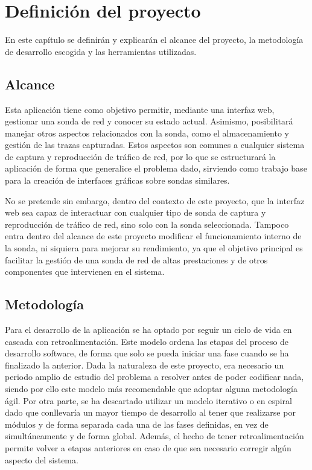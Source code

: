 \chapter{Definición del proyecto\label{cap:defProyecto}}

En este capítulo se definirán y explicarán el alcance del proyecto, la metodología de desarrollo escogida y las herramientas utilizadas.

\section{Alcance\label{sec:dp:alcance}}

Esta aplicación tiene como objetivo permitir, mediante una interfaz web, gestionar una sonda de red y conocer su estado actual.
Asimismo, posibilitará manejar otros aspectos relacionados con la sonda, como el almacenamiento y gestión de las \glspl{traza} capturadas.
Estos aspectos son comunes a cualquier sistema de captura y reproducción de tráfico de red, por lo que se estructurará la aplicación de forma que generalice el problema dado, sirviendo como trabajo base para la creación de interfaces gráficas sobre sondas similares.

No se pretende sin embargo, dentro del contexto de este proyecto, que la interfaz web sea capaz de interactuar con cualquier tipo de sonda de captura y reproducción de tráfico de red, sino solo con la sonda seleccionada.
Tampoco entra dentro del alcance de este proyecto modificar el funcionamiento interno de la sonda, ni siquiera para mejorar su rendimiento, ya que el objetivo principal es facilitar la gestión de una sonda de red de altas prestaciones y de otros componentes que intervienen en el sistema.

\section{Metodología\label{sec:dp:metodologia}}

Para el desarrollo de la aplicación se ha optado por seguir un ciclo de vida en cascada con retroalimentación.
Este modelo ordena las etapas del proceso de desarrollo software, de forma que solo se pueda iniciar una fase cuando se ha finalizado la anterior.
Dada la naturaleza de este proyecto, era necesario un periodo amplio de estudio del problema a resolver antes de poder codificar nada, siendo por ello este modelo más recomendable que adoptar alguna metodología ágil.
Por otra parte, se ha descartado utilizar un modelo iterativo o en espiral dado que conllevaría un mayor tiempo de desarrollo al tener que realizarse por módulos y de forma separada cada una de las fases definidas, en vez de simultáneamente y de forma global.
Además, el hecho de tener retroalimentación permite volver a etapas anteriores en caso de que sea necesario corregir algún aspecto del sistema.


